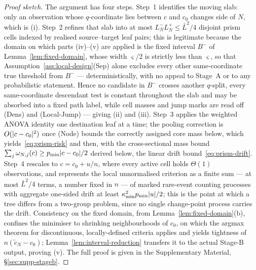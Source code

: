 \documentclass[11pt]{article}
\theoremstyle{plain}
\theoremstyle{definition}
\theoremstyle{remark}
\DeclarePairedDelimiter{\abs}{\lvert}{\rvert}
\begin{document}
\begin{proof}[Proof sketch]
The argument has four steps. Step~1 identifies the moving slab: only an
observation whose $q$-coordinate lies between $c$ and $c_0$ changes side of
$N$, which is (i). Step~2 refines that slab into at most
$L_N^-L_N^+\le\bar L^2/4$ disjoint prism cells indexed by realised
source--target leaf pairs; this is legitimate because the domain on which
parts (iv)--(v) are applied is the fixed interval $B^-$ of
Lemma~\ref{lem:fixed-domain}, whose width $\varsigma/2$ is strictly less
than $\varsigma$, so that Assumption~\ref{ass:local-design}(Sep) alone
excludes every other same-coordinate true threshold from $B^-$ ---
deterministically, with no appeal to Stage~A or to any probabilistic
statement. Hence no candidate in $B^-$ crosses another $q$-split, every
same-coordinate
descendant test is constant throughout the slab and may be absorbed into a
fixed path label, while cell masses and jump marks are read off (Dens) and
(Local-Jump) --- giving (ii) and (iii). Step~3 applies the weighted ANOVA
identity one destination leaf at a time; the pooling correction is
$O(\abs{c-c_0}^2)$ once (Node) bounds the correctly assigned core mass below,
which yields~\eqref{eq:prism-risk} and then, with the cross-sectional mass
bound $\sum_j\omega_{N,j}(c)\ge p_{\min}\abs{c-c_0}/2$ derived below, the
linear drift
bound~\eqref{eq:prism-drift}. Step~4 rescales to $c=c_0+u/n$, where every
active cell holds $\Theta(1)$ observations, and represents the local
unnormalised criterion as a finite sum --- at most $\bar L^2/4$ terms, a number
fixed in $n$ --- of marked rare-event counting processes with aggregate
one-sided drift at least $\kappa_{\min}^2p_{\min}\abs u/2$; this is the point
at which a tree differs from a two-group problem, since no single change-point
process carries the drift. Consistency on the fixed domain, from
Lemma~\ref{lem:fixed-domain}(b), confines the minimiser to shrinking
neighbourhoods of $c_0$, on which the argmax theorem for discontinuous,
locally-defined criteria \citep{seootsu2018} applies and yields tightness of
$n(\widetilde c_N-c_0)$; Lemma~\ref{lem:interval-reduction} transfers it to
the actual Stage-B output, proving (v). The full proof is given in the
Supplementary Material, \S\ref{sec:supp-stageb}.
\end{proof}
\end{document}
